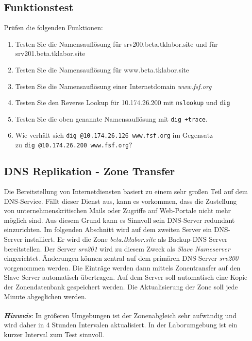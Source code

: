 \subsection{Funktionstest}
Prüfen die folgenden Funktionen:
\begin{enumerate}
  \item Testen Sie die Namensauflösung für srv200.beta.tklabor.site und für
  srv201.beta.tklabor.site
  \item Testen Sie die Namensauflösung für www.beta.tklabor.site
  \item Testen Sie die Namensauflösung einer Internetdomain \textit{www.fsf.org}
  \item Testen Sie den Reverse Lookup für 10.174.26.200 mit \texttt{nslookup}
  und \texttt{dig}
  \item Testen Sie die oben genannte Namensauflösung mit \texttt{dig +trace}.
  \item Wie verhält sich \texttt{dig @10.174.26.126 www.fsf.org} im Gegensatz\\
  zu \texttt{dig @10.174.26.200 www.fsf.org}?
\end{enumerate}

\subsection{DNS Replikation - Zone Transfer}
Die Bereitstellung von Internetdiensten basiert zu einem sehr großen Teil auf
dem DNS-Service. Fällt dieser Dienst aus, kann es vorkommen, dass die Zustellung
von unternehmenskritischen Mails oder Zugriffe auf Web-Portale nicht mehr
möglich sind. Aus diesem Grund kann es Sinnvoll sein DNS-Server redundant
einzurichten. Im folgenden Abschnitt wird auf dem zweiten Server ein DNS-Server
installiert. Er wird die Zone \textit{beta.tklabor.site} als Backup-DNS Server
bereitstellen. Der Server \textit{srv201} wird zu diesem Zweck als \textit{Slave
Nameserver} eingerichtet. Änderungen können zentral auf dem primären DNS-Server
\textit{srv200} vorgenommen werden. Die Einträge werden dann mittels
Zonentransfer auf den Slave-Server automatisch übertragen. Auf dem Server soll
automatisch eine Kopie der Zonendatenbank gespeichert werden. Die Aktualisierung
der Zone soll jede Minute abgeglichen werden.\\
\\
\textbf{\textit{Hinweis}}: In größeren Umgebungen ist der Zonenabgleich sehr
aufwändig und wird daher in 4 Stunden Intervalen aktualisiert. In der
Laborumgebung ist ein kurzer Interval zum Test sinnvoll.

